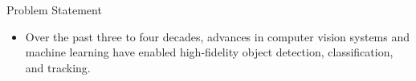 \documentclass[10pt]{beamer}
\begin{document}
\begin{frame}{Problem Statement}

\begin{itemize}
\item Over the past three to four decades, advances in computer vision systems and machine learning have enabled high-fidelity object detection, classification, and tracking.
%
%
%

%
%
%
%
%
%



\end{itemize}
\end{frame}
\end{document}
